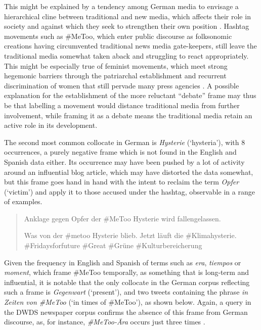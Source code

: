 \documentclass[output=paper,english,spanish,german,english]{langsci/langscibook}
\begin{document}
This might be explained by a tendency among German media to envisage a hierarchical cline between traditional and new media, which affects their role in society and against which they seek to strengthen their own position \parencite[382]{kornemann18}. Hashtag movements such as \#MeToo, which enter public discourse as folksonomic creations having circumvented traditional news media gate-keepers, still leave the traditional media somewhat taken aback and struggling to react appropriately. This might be especially true of feminist movements, which meet strong hegemonic barriers through the patriarchal establishment and recurrent discrimination of women that still pervade many press agencies \parencite{banet18}. A possible explanation for the establishment of the more reluctant \enquote{debate} frame may thus be that labelling \mt a movement would distance traditional media from further involvement, while framing it as a debate means the traditional media retain an active role in its development.

The second most common collocate in German is \textit{Hysterie} (`hysteria'), with 8 occurrences, a purely negative frame which is not found in the English and Spanish data either. Its occurrence may have been pushed by a lot of activity around an influential blog article, which may have distorted the data somewhat, but this frame goes hand in hand with the intent to reclaim the term \textit{Opfer} (`victim') and apply it to those accused under the \mt hashtag, observable in a range of examples.

\begin{quote}\sffamily
  \foreignlanguage{german}{Anklage gegen Opfer der \#MeToo Hysterie wird fallengelassen.}

  \foreignlanguage{german}{Was von der \#metoo Hysterie blieb. Jetzt läuft die \#Klimahysterie. \#Fridaysforfuture \#Great \#Grüne \#Kulturbereicherung}
\end{quote}

\noindent Given the frequency in English and Spanish of terms such as \textit{era}, \textit{tiempos} or \textit{moment}, which frame \#MeToo temporally, as something that is long-term and influential, it is notable that the only collocate in the German corpus reflecting such a frame is \textit{Gegenwart} (`present'), and two tweets containing the phrase \textit{in Zeiten von \#MeToo} (`in times of \#MeToo'), as shown below. Again, a query in the DWDS newspaper corpus confirms the absence of this frame from German discourse, as, for instance, \textit{\#MeToo-Ära} occurs just three times \parencite{dwds}.
\end{document}
